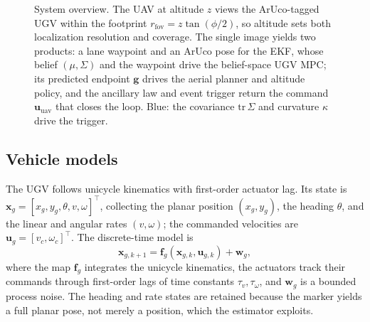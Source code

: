 \documentclass{ifacconf}
\begin{document}
\begin{figure}[t]
{}

\caption{System overview. The UAV at altitude $z$ views the ArUco-tagged UGV within the footprint
$r_{\mathrm{fov}}=z\tan(\phi/2)$, so altitude sets both localization resolution and coverage. The single
image yields two products: a lane waypoint and an ArUco pose for the EKF, whose belief $(\mu,\Sigma)$ and
the waypoint drive the belief-space UGV MPC; its predicted endpoint $\mathbf{g}$ drives the aerial planner
and altitude policy, and the ancillary law and event trigger return the command $\mathbf{u}_{\mathrm{uav}}$
that closes the loop. Blue: the covariance $\mathrm{tr}\,\Sigma$ and curvature $\kappa$ drive the trigger.}
\label{fig:system}
\end{figure}

\subsection{Vehicle models}
\label{sec:vehicles}
The UGV follows unicycle kinematics with first-order actuator lag. Its state is
$\mathbf{x}_g=[x_g,y_g,\theta,v,\omega]^{\!\top}$, collecting the planar position $(x_g,y_g)$, the
heading $\theta$, and the linear and angular rates $(v,\omega)$; the commanded velocities are
$\mathbf{u}_g=[v_c,\omega_c]^{\!\top}$. The discrete-time model is
\begin{equation}
\mathbf{x}_{g,k+1}=\mathbf{f}_g(\mathbf{x}_{g,k},\mathbf{u}_{g,k})+\mathbf{w}_g,
\label{eq:ugv}
\end{equation}
where the map $\mathbf{f}_g$ integrates the unicycle kinematics, the actuators track their commands
through first-order lags of time constants $\tau_v,\tau_\omega$, and $\mathbf{w}_g$ is a bounded
process noise. The heading and rate states are retained because the marker yields a full planar pose,
not merely a position, which the estimator exploits.
\end{document}
